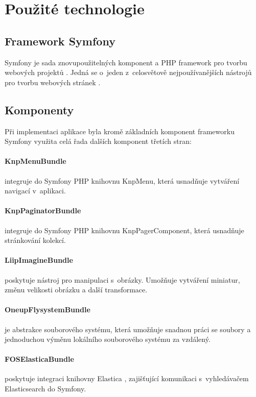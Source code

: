 \section{Použité technologie}\label{implementace-technologie}

\subsection{Framework Symfony}  
Symfony je sada znovupoužitelných komponent a PHP framework pro tvorbu webových projektů \autocite{symfony}. Jedná se o~jeden z~celosvětově nejpoužívanějších nástrojů pro tvorbu webových stránek \autocite{php-frameworky}.

\subsection{Komponenty}
Při implementaci aplikace byla kromě základních komponent frameworku Symfony využita celá řada dalších komponent třetích stran:

    \paragraph{KnpMenuBundle}
    integruje do Symfony PHP knihovnu KnpMenu, která usnadňuje vytváření navigací v~aplikaci. \autocite{knpmenu} 

    \paragraph{KnpPaginatorBundle}
    integruje do Symfony PHP knihovnu KnpPagerComponent, která usnadňuje stránkování kolekcí. \autocite{knppaginator}
    
    \paragraph{LiipImagineBundle}
    poskytuje nástroj pro manipulaci s~obrázky. Umožňuje vytváření miniatur, změnu velikosti obrázku a další transformace. \autocite{liipimagine}

    \paragraph{OneupFlysystemBundle}
    je abstrakce souborového systému, která umožňuje snadnou práci se soubory a jednoduchou výměnu lokálního souborového systému za vzdálený. \autocite{oneupflysytem}
   
    \paragraph{FOSElasticaBundle}
    poskytuje integraci knihovny Elastica \autocite{elastica}, zajišťující komunikaci s~vyhledávačem Elasticsearch \autocite{elasticsearch} do Symfony. \autocite{foselastica}  
   
